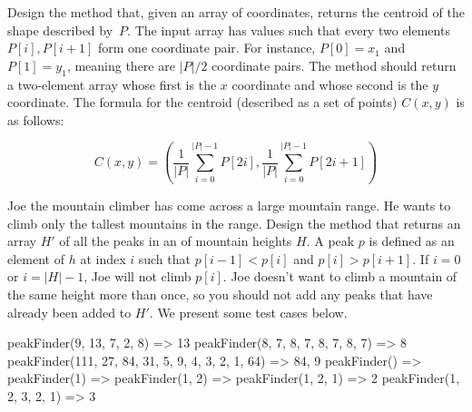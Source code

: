 Design the  method that, given an array of coordinates, returns the centroid of the shape described by~$P$. The input array has values such that every two elements $P[i], P[i+1]$ form one coordinate pair. For instance, $P[0] = x_1$ and $P[1] = y_1$, meaning there are $|P|/2$ coordinate pairs. The  method should return a two-element array whose first is the $x$ coordinate and whose second is the $y$ coordinate. The formula for the centroid (described as a set of points) $C(x, y)$ is as follows:

\[
    C(x, y) = \left(\dfrac{1}{|P|}\sum_{i=0}^{|P|-1}{P[2i]}, \dfrac{1}{|P|}\sum_{i=0}^{|P|-1}{P[2i+1]}\right)
\]


Joe the mountain climber has come across a large mountain range. He wants to climb only the tallest mountains in the range. Design the  method that returns an array $H'$ of all the peaks in an  of mountain heights $H$. A peak $p$ is defined as an element of $h$ at index $i$ such that $p[i - 1] < p[i]$ and $p[i] > p[i + 1]$. If $i = 0$ or $i = |H| - 1$, Joe will not climb $p[i]$. Joe doesn't want to climb a mountain of the same height more than once, so you should not add any peaks that have already been added to $H'$. We present some test cases below.

\begin{verbnobox}[\small]
peakFinder({9, 13, 7, 2, 8})                        => {13}
peakFinder({8, 7, 8, 7, 8, 7, 8, 7})                => {8}
peakFinder({111, 27, 84, 31, 5, 9, 4, 3, 2, 1, 64}) => {84, 9}
peakFinder({})                                      => {}
peakFinder({1})                                     => {}
peakFinder({1, 2})                                  => {}
peakFinder({1, 2, 1})                               => {2}
peakFinder({1, 2, 3, 2, 1})                         => {3}
\end{verbnobox}


